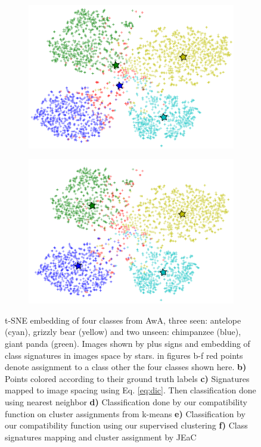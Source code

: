 \documentclass[letterpaper]{article}
\begin{document}
\begin{figure}[t]
%
  \begin{subfigure}[b]{0.25\linewidth}
    \includegraphics[width=\linewidth]{own_cluster}
    \caption{}
    \label{fig:clustering}
  \end{subfigure}
%
  \begin{subfigure}[b]{0.25\linewidth}
    \label{fig:joint}
    \includegraphics[width=\linewidth]{jeac}
    \caption{}
  \end{subfigure}
  \caption{t-SNE embedding of four classes from AwA, three seen: antelope (cyan), grizzly bear (yellow) and two
  unseen: chimpanzee (blue), giant panda (green). Images shown by plus signs and embedding of class signatures in images space by stars.
  in figures b-f red points denote assignment to a class other the four classes shown here.
  \textbf{b)} Points colored according to their ground truth labels
  \textbf{c)} Signatures mapped to image spacing using Eq. \eqref{eq:dic}. Then classification done using nearest neighbor
  \textbf{d)} Classification done by our compatibility function on cluster assignments from k-means
  \textbf{e)} Classification by our compatibility function using our supervised clustering
  \textbf{f)} Class signatures mapping and cluster assignment by JEaC
  }
  \label{fig:tsne}
\end{figure}
\end{document}
